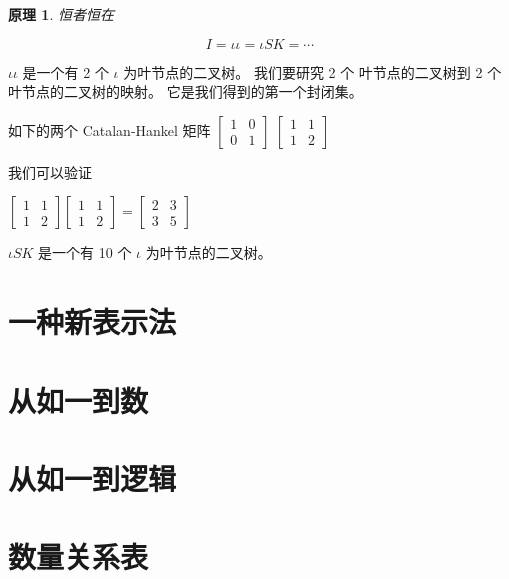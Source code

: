 \documentclass[a4paper,12pt]{article}
\numberwithin{definition}{section}
\numberwithin{lemma}{section}
\numberwithin{proposition}{section}
\numberwithin{theorem}{section}
\numberwithin{grammar}{section}
\numberwithin{program}{section}
\numberwithin{convention}{section}
\numberwithin{corollary}{section}
\newtheorem{principle}{原理}
\numberwithin{principle}{section}
\begin{document}
\begin{principle}
恒者恒在
\end{principle}

$$I = \iota \iota = \iota S K = \cdots $$

$\iota \iota$ 是一个有 2 个 $\iota$ 为叶节点的二叉树。
我们要研究 2 个 叶节点的二叉树到 2 个 叶节点的二叉树的映射。
它是我们得到的第一个封闭集。

如下的两个 Catalan-Hankel 矩阵
$\begin{bmatrix}1 & 0 \\ 0 & 1\end{bmatrix}$
$\begin{bmatrix}1 & 1 \\ 1 & 2\end{bmatrix}$

我们可以验证

$\begin{bmatrix}1 & 1 \\ 1 & 2\end{bmatrix}\begin{bmatrix}1 & 1 \\ 1 & 2\end{bmatrix} = \begin{bmatrix}2 & 3 \\ 3 & 5\end{bmatrix}$


$\iota S K$ 是一个有 10 个 $\iota$ 为叶节点的二叉树。


\newpage

\section{一种新表示法}


\section{从如一到数}


\section{从如一到逻辑}



\newpage

\appendix
\newpage

\section{数量关系表}
\end{document}
